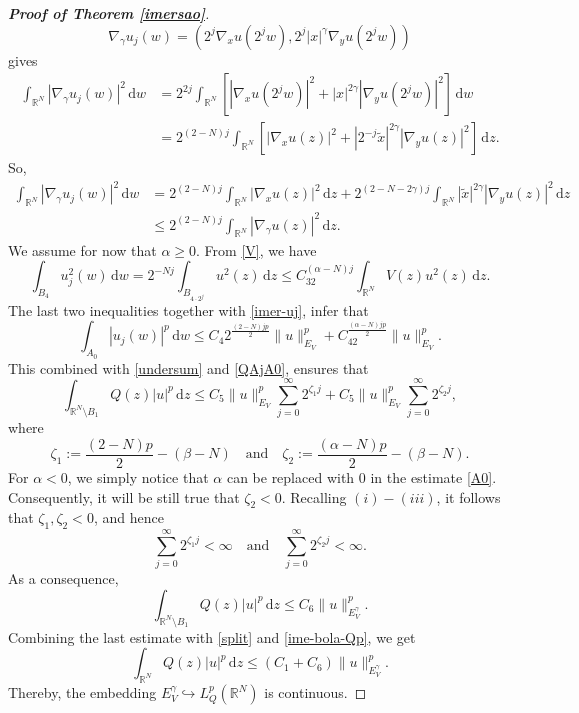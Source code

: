 \documentclass[12pt]{amsart}
\begin{document}
\begin{proof}[\textbf{\textit{Proof of Theorem \ref{imersao}}}]
$$
	\nabla_\gamma u_j(w) =  \left(2^j \nabla_x u(2^j w),2^j |x|^{\gamma} \nabla_y u(2^j w) \right) 
	$$
	gives
$$
	\begin{aligned}
		\int_{\mathbb{R}^N}  |\nabla_\gamma u_j(w) |^2 \,\mathrm{d}w &= 2^{2j} \int_{\mathbb{R}^N}   \left[ |\nabla_{x} u(2^jw)|^2 + |x|^{2\gamma} |\nabla_{y} u(2^jw)|^2\right]  \,\mathrm{d}w
		\\
		&=2^{(2-N)j}\int_{\mathbb{R}^N}   \left[ |\nabla_{x} u(z)|^2 + |2^{-j}\widetilde{x}|^{2\gamma} |\nabla_{y} u(z)|^2\right]  \,\mathrm{d}z.
	\end{aligned}
	$$
So,
	$$
	\begin{aligned}
		\int_{\mathbb{R}^N}  |\nabla_\gamma u_j(w) |^2 \,\mathrm{d}w &= 2^{(2-N)j}\int_{\mathbb{R}^N}|\nabla_{x} u(z)|^2\,\mathrm{d}z + 2^{(2-N-2\gamma)j}\int_{\mathbb{R}^N}|\widetilde{x}|^{2\gamma} |\nabla_{y} u(z)|^2\,\mathrm{d}z
		\\
		&\leq 2^{(2-N)j} \int_{\mathbb{R}^N} |\nabla_{\gamma} u(z)|^2  \,\mathrm{d}z.
	\end{aligned}
	$$
    We assume for now that $\alpha\geq0$. From \ref{V}, we have
\begin{equation}\label{A0}
 \int_{B_4}u_j^2(w) \, \mathrm{d}w = 2^{-Nj}\int_{B_{4\cdot2^j}}u^2(z) \, \mathrm{d}z \leq C_32^{(\alpha-N)j}\int_{\mathbb{R}^N} V(z)u^2(z) \, \mathrm{d}z.   
\end{equation}
    The last two inequalities together with \eqref{imer-uj}, infer that
    $$
\int_{A_0}  |u_j(w)|^p \,\mathrm{d}w \leq C_4 2^{\frac{(2-N)jp}{2}}\|u\|_{E_V}^p + C_42^{\frac{(\alpha-N)jp}{2}}\|u\|_{E_V}^p.
 $$
This combined with \eqref{undersum} and \eqref{QAjA0}, ensures that
 $$
\int_{\mathbb{R}^N\setminus B_1}Q(z)|u|^p\,\mathrm{d}z \leq C_5\|u\|_{E_V}^p \sum_{j=0}^\infty2^{\zeta_1j}+ C_5\|u\|_{E_V}^p \sum_{j=0}^\infty 2^{\zeta_2j},
$$
where
\begin{equation}\label{zetas}
		\zeta_1:=\frac{(2-N)p}{2}-(\beta-N)\quad 
		\mbox{and} \quad
		\zeta_2:=\frac{(\alpha-N)p}{2}-(\beta-N).
	\end{equation}
For $\alpha<0$, we simply notice that $\alpha$ can be replaced with $0$ in the estimate \eqref{A0}. Consequently, it will be still true that $\zeta_2<0$. Recalling $(i)-(iii)$, it follows that $\zeta_1,\zeta_2<0$, and hence
$$
\sum_{j=0}^\infty2^{\zeta_1j} < \infty \quad \mbox{and} \quad \sum_{j=0}^\infty2^{\zeta_2j}<\infty.
$$
    As a consequence,
$$
\int_{\mathbb{R}^N\setminus B_1}Q(z)|u|^p\,\mathrm{d}z \leq C_6\|u\|_{E_V^{\gamma}}^p.
$$
 Combining the last estimate with \eqref{split} and \eqref{ime-bola-Qp}, we get
	$$\int_{\mathbb{R}^N}Q(z)|u|^p\,\mathrm{d}z \leq (C_1+C_6)\|u\|_{E_V^\gamma}^p.
	$$
	Thereby, the embedding $E_V^\gamma \hookrightarrow L^p_Q(\mathbb{R}^N)$ is continuous.




\end{proof}
\end{document}
